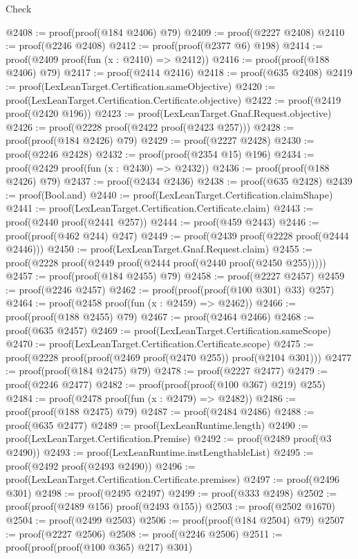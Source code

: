 \begin{lexlean}{Check}
\begin{coremodule}
@2408 := proof(proof(@184 @2406) @79)
@2409 := proof(@2227 @2408)
@2410 := proof(@2246 @2408)
@2412 := proof(proof(@2377 @6) @198)
@2414 := proof(@2409 proof(fun (x : @2410) => @2412))
@2416 := proof(proof(@188 @2406) @79)
@2417 := proof(@2414 @2416)
@2418 := proof(@635 @2408)
@2419 := proof(LexLeanTarget.Certification.sameObjective)
@2420 := proof(LexLeanTarget.Certification.Certificate.objective)
@2422 := proof(@2419 proof(@2420 @196))
@2423 := proof(LexLeanTarget.Gnaf.Request.objective)
@2426 := proof(@2228 proof(@2422 proof(@2423 @257)))
@2428 := proof(proof(@184 @2426) @79)
@2429 := proof(@2227 @2428)
@2430 := proof(@2246 @2428)
@2432 := proof(proof(@2354 @15) @196)
@2434 := proof(@2429 proof(fun (x : @2430) => @2432))
@2436 := proof(proof(@188 @2426) @79)
@2437 := proof(@2434 @2436)
@2438 := proof(@635 @2428)
@2439 := proof(Bool.and)
@2440 := proof(LexLeanTarget.Certification.claimShape)
@2441 := proof(LexLeanTarget.Certification.Certificate.claim)
@2443 := proof(@2440 proof(@2441 @257))
@2444 := proof(@459 @2443)
@2446 := proof(proof(@462 @244) @247)
@2449 := proof(@2439 proof(@2228 proof(@2444 @2446)))
@2450 := proof(LexLeanTarget.Gnaf.Request.claim)
@2455 := proof(@2228 proof(@2449 proof(@2444 proof(@2440 proof(@2450 @255)))))
@2457 := proof(proof(@184 @2455) @79)
@2458 := proof(@2227 @2457)
@2459 := proof(@2246 @2457)
@2462 := proof(proof(proof(@100 @301) @33) @257)
@2464 := proof(@2458 proof(fun (x : @2459) => @2462))
@2466 := proof(proof(@188 @2455) @79)
@2467 := proof(@2464 @2466)
@2468 := proof(@635 @2457)
@2469 := proof(LexLeanTarget.Certification.sameScope)
@2470 := proof(LexLeanTarget.Certification.Certificate.scope)
@2475 := proof(@2228 proof(proof(@2469 proof(@2470 @255)) proof(@2104 @301)))
@2477 := proof(proof(@184 @2475) @79)
@2478 := proof(@2227 @2477)
@2479 := proof(@2246 @2477)
@2482 := proof(proof(proof(@100 @367) @219) @255)
@2484 := proof(@2478 proof(fun (x : @2479) => @2482))
@2486 := proof(proof(@188 @2475) @79)
@2487 := proof(@2484 @2486)
@2488 := proof(@635 @2477)
@2489 := proof(LexLeanRuntime.length)
@2490 := proof(LexLeanTarget.Certification.Premise)
@2492 := proof(@2489 proof(@3 @2490))
@2493 := proof(LexLeanRuntime.instLengthableList)
@2495 := proof(@2492 proof(@2493 @2490))
@2496 := proof(LexLeanTarget.Certification.Certificate.premises)
@2497 := proof(@2496 @301)
@2498 := proof(@2495 @2497)
@2499 := proof(@333 @2498)
@2502 := proof(proof(@2489 @156) proof(@2493 @155))
@2503 := proof(@2502 @1670)
@2504 := proof(@2499 @2503)
@2506 := proof(proof(@184 @2504) @79)
@2507 := proof(@2227 @2506)
@2508 := proof(@2246 @2506)
@2511 := proof(proof(proof(@100 @365) @217) @301)

\end{coremodule}
\end{lexlean}
